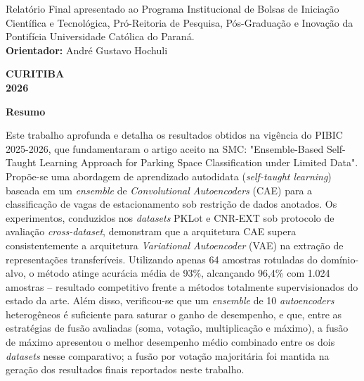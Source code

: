 \documentclass{article}
\begin{document}
\vspace{3cm}

\begin{flushright}
    \begin{minipage}{0.5\textwidth}
         \small
        Relatório Final apresentado ao Programa Institucional de Bolsas de Iniciação Científica e Tecnológica, Pró-Reitoria de Pesquisa, Pós-Graduação e Inovação da Pontifícia Universidade Católica do Paraná. \\
        \textbf{Orientador:} André Gustavo Hochuli
    \end{minipage}
    
\end{flushright}

\vspace{\fill}

\begin{center}
    \textbf{CURITIBA} \\
    \textbf{2026}
\end{center}

\newpage
\begin{center}
    \textbf{Resumo}
    
\end{center}

Este trabalho aprofunda e detalha os resultados obtidos na vigência do PIBIC 2025-2026, que fundamentaram o artigo aceito na SMC: "Ensemble-Based Self-Taught Learning Approach for Parking Space Classification under Limited Data". Propõe-se uma abordagem de aprendizado autodidata (\textit{self-taught learning}) baseada em um \textit{ensemble} de \textit{Convolutional Autoencoders} (CAE) para a classificação de vagas de estacionamento sob restrição de dados anotados. Os experimentos, conduzidos nos \textit{datasets} PKLot e CNR-EXT sob protocolo de avaliação \textit{cross-dataset}, demonstram que a arquitetura CAE supera consistentemente a arquitetura \textit{Variational Autoencoder} (VAE) na extração de representações transferíveis. Utilizando apenas 64 amostras rotuladas do domínio-alvo, o método atinge acurácia média de 93\%, alcançando 96,4\% com 1.024 amostras -- resultado competitivo frente a métodos totalmente supervisionados do estado da arte. Além disso, verificou-se que um \textit{ensemble} de 10 \textit{autoencoders} heterogêneos é suficiente para saturar o ganho de desempenho, e que, entre as estratégias de fusão avaliadas (soma, votação, multiplicação e máximo), a fusão de máximo apresentou o melhor desempenho médio combinado entre os dois \textit{datasets} nesse comparativo; a fusão por votação majoritária foi mantida na geração dos resultados finais reportados neste trabalho.
\end{document}
